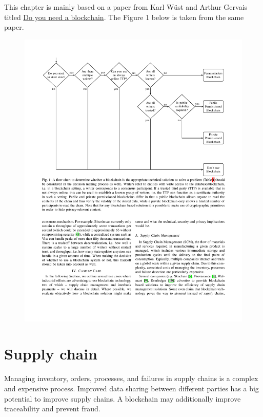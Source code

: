 


\noindent
This chapter is mainly based on a paper from Karl Wüst and Arthur Gervais titled \href{https://eprint.iacr.org/2017/375.pdf}{Do you need a blockchain}.
The Figure 1 below is taken from the same paper.

\begin{figure}[h!]
	\includegraphics[width=\textwidth]{fig/FlowChart}
	
\end{figure}

\section{Supply chain}
Managing inventory, orders, processes, and failures in supply chains is a complex and expensive process. 
Improved data sharing between different parties has a big potential to improve supply chains.
A blockchain may additionally improve traceability and prevent fraud.


